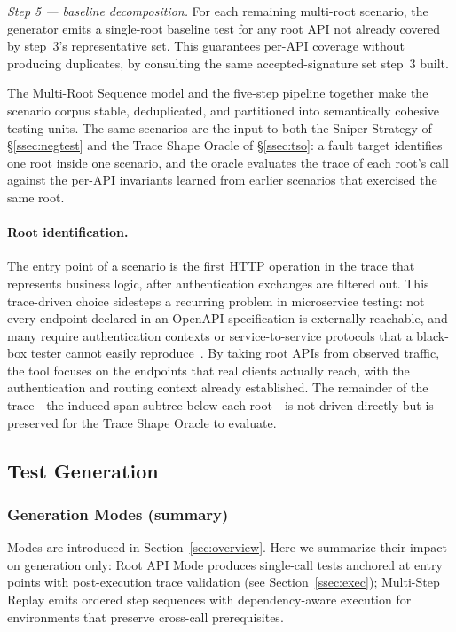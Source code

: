 \documentclass[conference]{IEEEtran}
\begin{document}
\emph{Step 5 --- baseline decomposition.}
For each remaining multi-root scenario, the generator emits a single-root baseline test for any root API not already covered by step~3's representative set. This guarantees per-API coverage without producing duplicates, by consulting the same accepted-signature set step~3 built.

The Multi-Root Sequence model and the five-step pipeline together make the scenario corpus stable, deduplicated, and partitioned into semantically cohesive testing units. The same scenarios are the input to both the Sniper Strategy of \S\ref{ssec:negtest} and the Trace Shape Oracle of \S\ref{ssec:tso}: a fault target identifies one root inside one scenario, and the oracle evaluates the trace of each root's call against the per-API invariants learned from earlier scenarios that exercised the same root.

\paragraph{Root identification.}
The entry point of a scenario is the first HTTP operation in the trace that represents business logic, after authentication exchanges are filtered out. This trace-driven choice sidesteps a recurring problem in microservice testing: not every endpoint declared in an OpenAPI specification is externally reachable, and many require authentication contexts or service-to-service protocols that a black-box tester cannot easily reproduce~\cite{waseem2020testing,zhou2018microservice,microservice-testing-review-2023}. By taking root APIs from observed traffic, the tool focuses on the endpoints that real clients actually reach, with the authentication and routing context already established. The remainder of the trace---the induced span subtree below each root---is not driven directly but is preserved for the Trace Shape Oracle to evaluate.

\subsection{Test Generation}
\label{ssec:gen}

\subsubsection*{Generation Modes (summary)}\label{ssec:gen-modes}
Modes are introduced in Section~\ref{sec:overview}. Here we summarize their impact on generation only: Root API Mode produces single-call tests anchored at entry points with post-execution trace validation (see Section~\ref{ssec:exec}); Multi-Step Replay emits ordered step sequences with dependency-aware execution for environments that preserve cross-call prerequisites.
\end{document}
